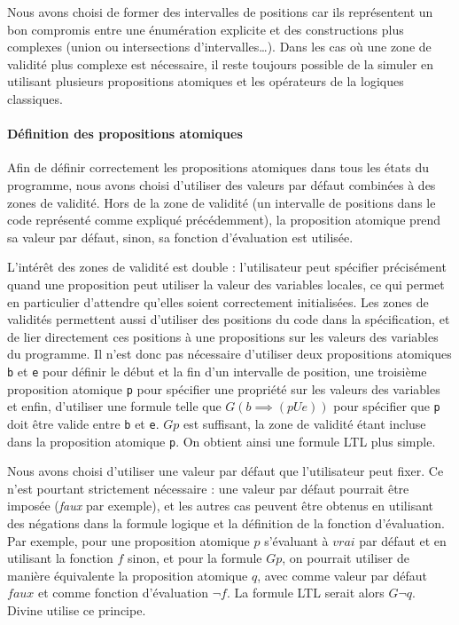 Nous avons choisi de former des intervalles de positions car ils
représentent un bon compromis entre une énumération explicite et des
constructions plus complexes (union ou intersections
d'intervalles\ldots{}). Dans les cas où une zone de validité plus
complexe est nécessaire, il reste toujours possible de la simuler en
utilisant plusieurs propositions atomiques et les opérateurs de la
logiques classiques.

\paragraph{Définition des propositions atomiques}

Afin de définir correctement les propositions atomiques dans tous les
états du programme, nous avons choisi d'utiliser des valeurs par défaut
combinées à des zones de validité. Hors de la zone de validité (un
intervalle de positions dans le code représenté comme expliqué
précédemment), la proposition atomique prend sa valeur par défaut,
sinon, sa fonction d'évaluation est utilisée.

L'intérêt des zones de validité est double : l'utilisateur peut
spécifier précisément quand une proposition peut utiliser la valeur des
variables locales, ce qui permet en particulier d'attendre qu'elles
soient correctement initialisées. Les zones de validités permettent
aussi d'utiliser des positions du code dans la spécification, et de lier
directement ces positions à une propositions sur les valeurs des
variables du programme. Il n'est donc pas nécessaire d'utiliser deux
propositions atomiques \lstinline!b! et \lstinline!e! pour définir le
début et la fin d'un intervalle de position, une troisième proposition
atomique \lstinline!p! pour spécifier une propriété sur les valeurs des
variables et enfin, d'utiliser une formule telle que
\(G (b \implies (p U e))\) pour spécifier que \lstinline!p! doit être
valide entre \lstinline!b! et \lstinline!e!. \(G p\) est suffisant, la
zone de validité étant incluse dans la proposition atomique
\lstinline!p!. On obtient ainsi une formule LTL plus simple.

Nous avons choisi d'utiliser une valeur par défaut que l'utilisateur
peut fixer. Ce n'est pourtant strictement nécessaire : une valeur par
défaut pourrait être imposée (\emph{faux} par exemple), et les autres
cas peuvent être obtenus en utilisant des négations dans la formule
logique et la définition de la fonction d'évaluation. Par exemple, pour
une proposition atomique \(p\) s'évaluant à \(vrai\) par défaut et en
utilisant la fonction \(f\) sinon, et pour la formule \(G p\), on
pourrait utiliser de manière équivalente la proposition atomique \(q\),
avec comme valeur par défaut \(faux\) et comme fonction d'évaluation
\(\lnot f\). La formule LTL serait alors \(G \lnot q\). Divine
\cite{Divine_LTL} utilise ce principe.


